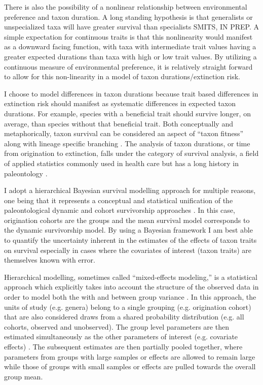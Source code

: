 \documentclass[12pt,letterpaper]{article}
\begin{document}
There is also the possibility of a nonlinear relationship between environmental preference and taxon duration. A long standing hypothesis is that generalists or unspecialized taxa will have greater survival than specialists \citep{Simpson1944,Liow2004a,Liow2007b,Nurnberg2013a,Nurnberg2015,Baumiller1993} \uppercase{Smits, in prep}. A simple expectation for continuous traits is that this nonlinearity would manifest as a downward facing function, with taxa with intermediate trait values having a greater expected durations than taxa with high or low trait values. By utilizing a continuous measure of environmental preference, it is relatively straight forward to allow for this non-linearity in a model of taxon durations/extinction risk.

I choose to model differences in taxon durations because trait based differences in extinction risk should manifest as systematic differences in expected taxon durations. For example, species with a beneficial trait should survive longer, on average, than species without that beneficial trait. Both conceptually and metaphorically, taxon survival can be considered an aspect of ``taxon fitness'' along with lineage specific branching \citep{Cooper1984,Palmer2012}. The analysis of taxon durations, or time from origination to extinction, falls under the category of survival analysis, a field of applied statistics commonly used in health care \citep{Klein2003} but has a long history in paleontology \citep{Simpson1944,Simpson1953,VanValen1973,VanValen1979}.

I adopt a hierarchical Bayesian survival modelling approach for multiple reasons, one being that it represents a conceptual and statistical unification of the paleontological dynamic and cohort survivorship approaches \citep{VanValen1973,VanValen1979,Raup1978,Raup1975,Foote1988,Baumiller1993,Simpson2006}. In this case, origination cohorts are the groups and the mean survival model corresponds to the dynamic survivorship model. By using a Bayesian framework I am best able to quantify the uncertainty inherent in the estimates of the effects of taxon traits on survival especially in cases where the covariates of interest (taxon traits) are themselves known with error.

Hierarchical modelling, sometimes called ``mixed-effects modeling,'' is a statistical approach which explicitly takes into account the structure of the observed data in order to model both the with and between group variance \citep{Gelman2013d,Gelman2007}. In this approach, the units of study (e.g. genera) belong to a single grouping (e.g. origination cohort) that are also considered draws from a shared probability distribution (e.g. all cohorts, observed and unobserved). The group level parameters are then estimated simultaneously as the other parameters of interest (e.g. covariate effects) \citep{Gelman2013d}. The subsequent estimates are then partially pooled together, where parameters from groups with large samples or effects are allowed to remain large while those of groups with small samples or effects are pulled towards the overall group mean.
\end{document}

